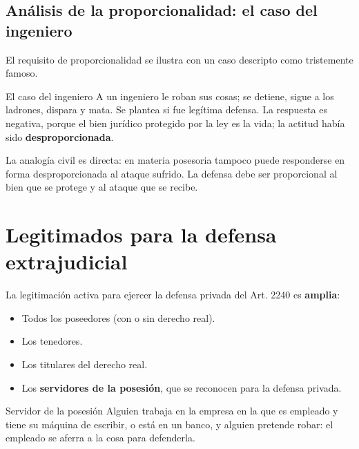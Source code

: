 \documentclass[12pt,oneside]{book}
\begin{document}
\subsection{Análisis de la proporcionalidad: el caso del ingeniero}

El requisito de proporcionalidad se ilustra con un caso descripto como tristemente famoso.

\begin{example}{El caso del ingeniero}
A un ingeniero le roban sus cosas; se detiene, sigue a los ladrones, dispara y mata. Se plantea si fue legítima defensa. La respuesta es negativa, porque el bien jurídico protegido por la ley es la vida; la actitud había sido \textbf{desproporcionada}.
\end{example}

La analogía civil es directa: en materia posesoria tampoco puede responderse en forma desproporcionada al ataque sufrido. La defensa debe ser proporcional al bien que se protege y al ataque que se recibe.

\section{Legitimados para la defensa extrajudicial}

La legitimación activa para ejercer la defensa privada del Art. 2240 es \textbf{amplia}:

\begin{itemize}
    \item Todos los poseedores (con o sin derecho real).
    \item Los tenedores.
    \item Los titulares del derecho real.
    \item Los \textbf{servidores de la posesión}, que se reconocen para la defensa privada.
\end{itemize}

\begin{example}{Servidor de la posesión}
Alguien trabaja en la empresa en la que es empleado y tiene su máquina de escribir, o está en un banco, y alguien pretende robar: el empleado se aferra a la cosa para defenderla.
\end{example}
\end{document}
